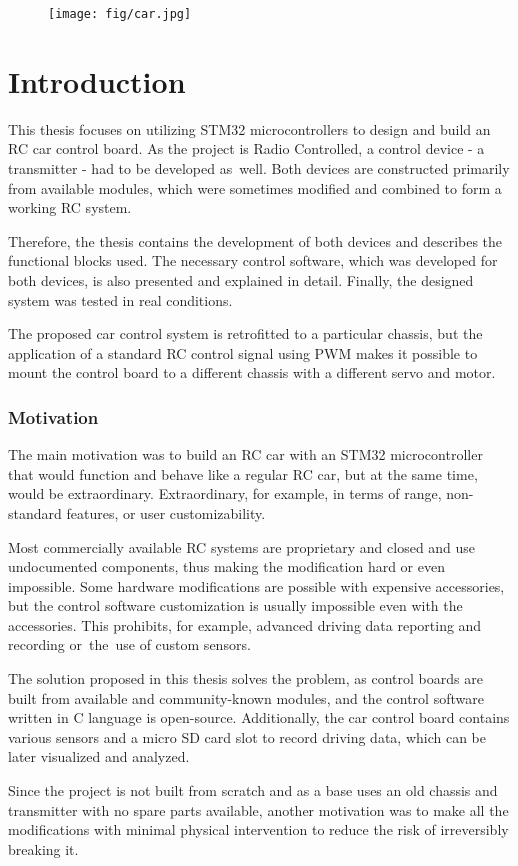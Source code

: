 
\begin{figure}[ht]
\centering
\texttt{[image: fig/car.jpg]}
\end{figure}
\part{Introduction}
\label{chap:intro}
\begin{myparindent}{20pt}
This thesis focuses on utilizing STM32 microcontrollers to design and build an RC car control board. As the project is Radio Controlled, a control device - a transmitter - had to be developed as~well. Both devices are constructed primarily from available modules, which were sometimes modified and combined to form a working RC system.
\end{myparindent}

Therefore, the thesis contains the development of both devices and describes the functional blocks used. The necessary control software, which was developed for both devices, is also presented and explained in detail. Finally, the designed system was tested in real conditions.

The proposed car control system is retrofitted to a particular chassis, but the application of a standard RC control signal using PWM makes it possible to mount the control board to a different chassis with a different servo and motor.

\section{Motivation}
The main motivation was to build an RC car with an STM32 microcontroller that would function and behave like a regular RC car, but at the same time, would be extraordinary. Extraordinary, for example, in terms of range, non-standard features, or user customizability.

Most commercially available RC systems are proprietary and closed and use undocumented components, thus making the modification hard or even impossible. Some hardware modifications are possible with expensive accessories, but the control software customization is usually impossible even with the accessories. This prohibits, for example, advanced driving data reporting and recording or~the~use of custom sensors.

The solution proposed in this thesis solves the problem, as control boards are built from available and community-known modules, and the control software written in C language is open-source. Additionally, the car control board contains various sensors and a micro SD card slot to record driving data, which can be later visualized and analyzed.

Since the project is not built from scratch and as a base uses an old chassis and transmitter with no spare parts available, another motivation was to make all the modifications with minimal physical intervention to reduce the risk of irreversibly breaking it.



